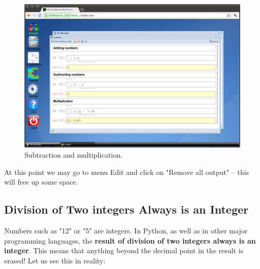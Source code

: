 \documentclass[article,A4,12pt]{llncs}
\begin{document}
\newpage
\begin{figure}[!ht]
\begin{center}
\includegraphics[width=\textwidth]{img/1p3r2.png}
\end{center}
\caption{Subtraction and multiplication.}
\label{fig:1p3r2}
\end{figure}
\noindent
At this point we may go to menu Edit and click on 
"Remove all output" -- this will free up some space.

\subsection{Division of Two integers Always is an Integer}

Numbers such as "12" or "5" are integers. In Python, as well as 
in other major programming languages, the {\bf result of division of 
two integers always is an integer}. This means that anything beyond 
the decimal point in the result is erased! Let us see this in reality:
\end{document}
